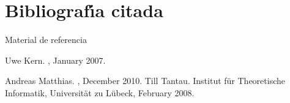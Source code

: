\documentclass[]{beamer}
\theoremstyle{plain}
\begin{document}
\section{Bibliograf\'{\i}a citada}
\begin{frame}{Material de referencia }

  \begin{thebibliography}{10}

    Uwe Kern.
    , January 2007.

    Andreas Matthias.
    , December 2010.
    Till Tantau.
    \newblock Institut f\"{u}r Theoretische Informatik, Universit\"{a}t zu
      L\"{u}beck, February 2008.



  \end{thebibliography}

\end{frame}
\end{document}
